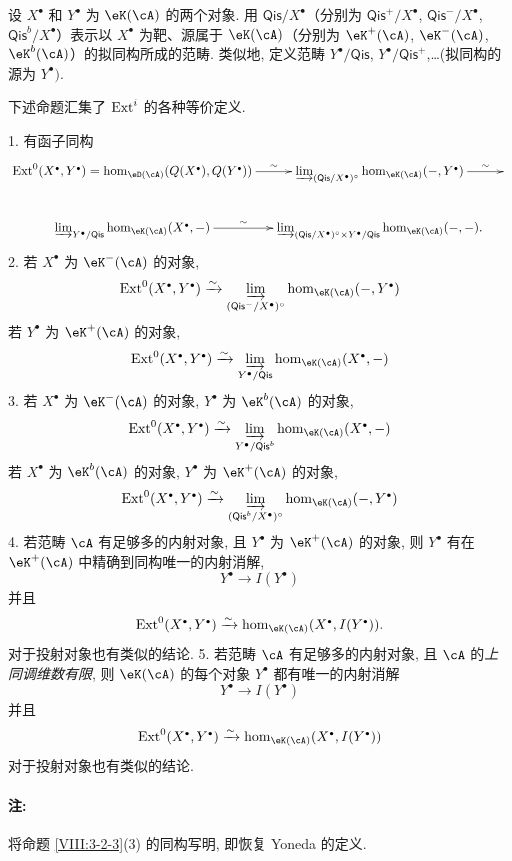 设 $X^\bullet$ 和 $Y^\bullet$ 为 $\eK(\cA)$ 的两个对象. 用 $\mathsf{Qis}/X^\bullet$（分别为 $\mathsf{Qis}^+/X^\bullet$, $\mathsf{Qis}^-/X^\bullet$, $\mathsf{Qis}^b/X^\bullet$）表示以 $X^\bullet$ 为靶、源属于 $\eK(\cA)$（分别为 $\eK^+(\cA)$, $\eK^-(\cA)$, $\eK^b(\cA)$）的拟同构所成的范畴. 类似地, 定义范畴 $Y^\bullet/\mathsf{Qis}$, $Y^\bullet/\mathsf{Qis}^+$,\ldots (拟同构的源为 $Y^\bullet)$. 

下述命题汇集了 $\operatorname{Ext}^i$ 的各种等价定义.

\begin{proposition}\label{VIII:3-2-3}
1. 有函子同构
\[\xymatrix@C=1.1pc{
  \ext^0(X^\bullet,Y^\bullet) = \hom_{\eD(\cA)}(Q(X^\bullet),Q(Y^\bullet)) \ar[r]^-\sim
    & \varinjlim_{(\mathsf{Qis}/X^\bullet)^\circ} \hom_{\eK(\cA)}(-,Y^\bullet) \ar[r]^-\sim
    & \\
  \varinjlim_{Y^\bullet/\mathsf{Qis}} \hom_{\eK(\cA)}(X^\bullet,-) \ar[r]^-\sim
    & \varinjlim_{(\mathsf{Qis}/X^\bullet)^\circ \times Y^\bullet/\mathsf{Qis}} \hom_{\eK(\cA)}(-,-) \text{.}
}\]
2. 若 $X^\bullet$ 为 $\eK^-(\cA)$ 的对象,
\[
  \ext^0(X^\bullet,Y^\bullet) \iso \varinjlim_{(\mathsf{Qis}^-/X^\bullet)^\circ} \hom_{\eK(\cA)}(-,Y^\bullet)
\]
若 $Y^\bullet$ 为 $\eK^+(\cA)$ 的对象,
\[
  \ext^0(X^\bullet,Y^\bullet) \iso \varinjlim_{Y^\bullet/\mathsf{Qis}} \hom_{\eK(\cA)}(X^\bullet,-)
\]
3. 若 $X^\bullet$ 为 $\eK^-(\cA)$ 的对象, $Y^\bullet$ 为 $\eK^b(\cA)$ 的对象,
\[
  \ext^0(X^\bullet,Y^\bullet) \iso \varinjlim_{Y^\bullet/\mathsf{Qis}^b} \hom_{\eK(\cA)}(X^\bullet,-)
\]
若 $X^\bullet$ 为 $\eK^b(\cA)$ 的对象, $Y^\bullet$ 为 $\eK^+(\cA)$ 的对象,
\[
  \ext^0(X^\bullet,Y^\bullet) \iso \varinjlim_{(\mathsf{Qis}^b/X^\bullet)^\circ} \hom_{\eK(\cA)}(-,Y^\bullet)
\]
4. 若范畴 $\cA$ 有足够多的内射对象, 且 $Y^\bullet$ 为 $\eK^+(\cA)$ 的对象, 则 $Y^\bullet$ 有在 $\eK^+(\cA)$ 中精确到同构唯一的内射消解,
\[
  Y^\bullet \to I(Y^\bullet)
\]
并且
\[
  \ext^0(X^\bullet,Y^\bullet) \iso \hom_{\eK(\cA)}(X^\bullet,I(Y^\bullet)) \text{.}
\]
对于投射对象也有类似的结论.
5. 若范畴 $\cA$ 有足够多的内射对象, 且 $\cA$ 的\emph{上同调维数有限}, 则 $\eK(\cA)$ 的每个对象 $Y^\bullet$ 都有唯一的内射消解
\[
  Y^\bullet \to I(Y^\bullet)
\]
并且
\[
  \ext^0(X^\bullet,Y^\bullet) \iso \hom_{\eK(\cA)}(X^\bullet,I(Y^\bullet))
\]
对于投射对象也有类似的结论.
\end{proposition}

\paragraph{注:}
将命题 \ref{VIII:3-2-3}(3) 的同构写明, 即恢复 Yoneda 的定义.

